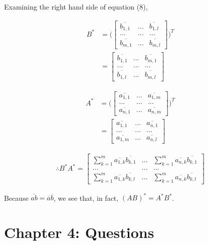 \documentclass{article}
\begin{document}
		Examining the right hand side of equation (8), 
		
		\begin{align*}
			B^*&=
			\Bigg(
			\begin{bmatrix}
			\overline{b_{1,1}}&...&\overline{b_{1,l}}\\
			...&...&...\\
			\overline{b_{m,1}}&...&\overline{b_{m,l}}
			\end{bmatrix}
			\Bigg)^{T}\\
			&=
			\begin{bmatrix}
			\overline{b_{1,1}}&...&\overline{b_{m,1}}\\
			...&...&...\\
			\overline{b_{1,l}}&...&\overline{b_{m,l}}
			\end{bmatrix}
		\end{align*}

		\begin{align*}
		A^*&=
		\Bigg(
		\begin{bmatrix}
		\overline{a_{1,1}}&...&\overline{a_{1,m}}\\
		...&...&...\\
		\overline{a_{n,1}}&...&\overline{a_{n,m}}
		\end{bmatrix}
		\Bigg)^{T}\\
		&=
		\begin{bmatrix}
		\overline{a_{1,1}}&...&\overline{a_{n,1}}\\
		...&...&...\\
		\overline{a_{1,m}}&...&\overline{a_{n,l}}
		\end{bmatrix}
		\end{align*}		
		
		\begin{align*}
			\therefore B^*A^*=
			\begin{bmatrix}
			\sum_{k=1}^{m}\overline{a_{1,k}}\overline{b_{k,1}}&...&\sum_{k=1}^{m}\overline{a_{n,k}}\overline{b_{k,1}}\\
			...&...&...\\
			\sum_{k=1}^{m}\overline{a_{1,k}}\overline{b_{k,l}}&...&\sum_{k=1}^{m}\overline{a_{n,k}}\overline{b_{k,l}}
			\end{bmatrix}
		\end{align*}
		
		Because $\overline{ab}=\overline{a}\overline{b}$, we see that, in fact, $(AB)^{*}=A^{*}B^{*}$.
	\section{Chapter 4: Questions}
\end{document}
